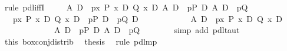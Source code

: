 \begin{isabellebody}
\isamarkupfalse%
\ {\isacharparenleft}rule\ pdl{\isacharunderscore}iffI{\isacharparenright}\isanewline
\ \ \isamarkupfalse%
\ {\isachardoublequote}{\isasymturnstile}\ {\isacharparenleft}A\ {\isasymlongrightarrow}\isactrlsub D\ {\isacharbrackleft}{\isacharhash}\ p{\isacharbrackright}{\isacharparenleft}{\isasymlambda}x{\isachardot}\ P\ x\ {\isasymand}\isactrlsub D\ Q\ x{\isacharparenright}{\isacharparenright}\ {\isasymlongrightarrow}\isactrlsub D\ {\isacharparenleft}A\ {\isasymlongrightarrow}\isactrlsub D\ {\isacharbrackleft}{\isacharhash}\ p{\isacharbrackright}P{\isacharparenright}\ {\isasymand}\isactrlsub D\ {\isacharparenleft}A\ {\isasymlongrightarrow}\isactrlsub D\ {\isacharbrackleft}{\isacharhash}\ p{\isacharbrackright}Q{\isacharparenright}{\isachardoublequote}\isanewline
\ \ \isamarkupfalse%
\ {\isacharminus}\isanewline
\ \ \ \ \isamarkupfalse%
\ {\isachardoublequote}{\isasymturnstile}\ {\isacharparenleft}{\isacharbrackleft}{\isacharhash}\ p{\isacharbrackright}{\isacharparenleft}{\isasymlambda}x{\isachardot}\ P\ x\ {\isasymand}\isactrlsub D\ Q\ x{\isacharparenright}\ {\isasymlongrightarrow}\isactrlsub D\ {\isacharbrackleft}{\isacharhash}\ p{\isacharbrackright}P\ {\isasymand}\isactrlsub D\ {\isacharbrackleft}{\isacharhash}\ p{\isacharbrackright}Q{\isacharparenright}\ {\isasymlongrightarrow}\isactrlsub D\isanewline
\ \ \ \ \ \ \ \ \ \ \ \ {\isacharparenleft}A\ {\isasymlongrightarrow}\isactrlsub D\ {\isacharbrackleft}{\isacharhash}\ p{\isacharbrackright}{\isacharparenleft}{\isasymlambda}x{\isachardot}\ P\ x\ {\isasymand}\isactrlsub D\ Q\ x{\isacharparenright}{\isacharparenright}\ {\isasymlongrightarrow}\isactrlsub D\ \isanewline
\ \ \ \ \ \ \ \ \ \ \ \ \ {\isacharparenleft}A\ {\isasymlongrightarrow}\isactrlsub D\ {\isacharbrackleft}{\isacharhash}\ p{\isacharbrackright}P{\isacharparenright}\ {\isasymand}\isactrlsub D\ {\isacharparenleft}A\ {\isasymlongrightarrow}\isactrlsub D\ {\isacharbrackleft}{\isacharhash}\ p{\isacharbrackright}Q{\isacharparenright}{\isachardoublequote}\isanewline
\ \ \ \ \ \ \isamarkupfalse%
\ {\isacharparenleft}simp\ add{\isacharcolon}\ pdl{\isacharunderscore}taut{\isacharparenright}\isanewline
\ \ \ \ \isamarkupfalse%
\ this\ box{\isacharunderscore}conj{\isacharunderscore}distrib{}\ \isamarkupfalse%
\ {\isacharquery}thesis\ \isamarkupfalse%
\ {\isacharparenleft}rule\ pdl{\isacharunderscore}mp{\isacharparenright}\isanewline
\ \ \isamarkupfalse%
\isanewline
\isamarkupfalse%

\end{isabellebody}
